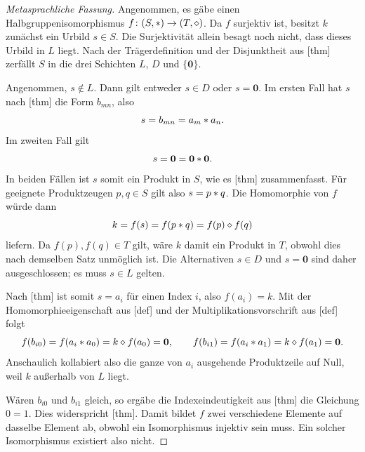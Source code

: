 \documentclass[main.tex]{subfiles}
\begin{document}
\begin{proof}[Metasprachliche Fassung]
Angenommen, es gäbe einen Halbgruppenisomorphismus
\(f\colon(S,\mathbin{\ast})\to(T,\mathbin{\diamond})\). Da \(f\) surjektiv ist, besitzt
\(k\) zunächst ein Urbild \(s\in S\). Die Surjektivität allein besagt noch
nicht, dass dieses Urbild in \(L\) liegt. Nach der Trägerdefinition und der
Disjunktheit aus [thm]
zerfällt \(S\) in die drei Schichten \(L\), \(D\) und
\(\{\mathbf0\}\).

Angenommen, \(s\notin L\). Dann gilt entweder \(s\in D\) oder
\(s=\mathbf0\). Im ersten Fall hat \(s\) nach
[thm] die Form \(b_{mn}\),
also
\[
  s=b_{mn}=a_m\mathbin{\ast} a_n.
\]
Im zweiten Fall gilt
\[
  s=\mathbf0=\mathbf0\mathbin{\ast}\mathbf0.
\]
In beiden Fällen ist \(s\) somit ein Produkt in \(S\), wie es
[thm] zusammenfasst.
Für geeignete Produktzeugen \(p,q\in S\) gilt also
\(s=p\mathbin{\ast} q\). Die Homomorphie von \(f\) würde dann
\[
  k=f(s)=f(p\mathbin{\ast} q)=f(p)\mathbin{\diamond} f(q)
\]
liefern. Da \(f(p),f(q)\in T\) gilt, wäre \(k\) damit ein Produkt in \(T\),
obwohl dies nach demselben Satz unmöglich ist. Die Alternativen \(s\in D\)
und \(s=\mathbf0\) sind daher ausgeschlossen; es muss \(s\in L\) gelten.

Nach [thm] ist somit
\(s=a_i\) für einen Index \(i\), also \(f(a_i)=k\). Mit der
Homomorphieeigenschaft aus [def] und der
Multiplikationsvorschrift aus [def]
folgt
\[
  f(b_{i0})
    =f(a_i\mathbin{\ast} a_0)
    =k\mathbin{\diamond} f(a_0)
    =\mathbf0,
  \qquad
  f(b_{i1})
    =f(a_i\mathbin{\ast} a_1)
    =k\mathbin{\diamond} f(a_1)
    =\mathbf0.
\]
Anschaulich kollabiert also die ganze von \(a_i\) ausgehende Produktzeile
auf Null, weil \(k\) außerhalb von \(L\) liegt.

Wären \(b_{i0}\) und \(b_{i1}\) gleich, so ergäbe die Indexeindeutigkeit
aus [thm] die Gleichung
\(0=1\). Dies widerspricht
[thm]. Damit bildet \(f\) zwei verschiedene
Elemente auf dasselbe Element ab, obwohl ein Isomorphismus injektiv sein
muss. Ein solcher Isomorphismus existiert also nicht.
\end{proof}
\end{document}
